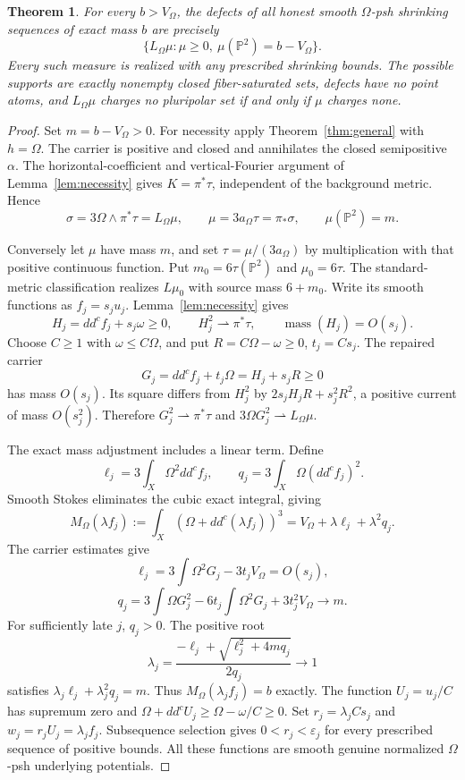 \documentclass[11pt]{article}
\newtheorem{theorem}{Theorem}
\newcommand{\ddc}{dd^c}
\begin{document}
\begin{theorem}\label{thm:arbitrary-metric}
For every $b>V_\Omega$, the defects of all honest smooth
$\Omega$-psh shrinking sequences of exact mass $b$ are precisely
\[
 \{L_\Omega\mu:\mu\geq0,\ \mu(\mathbb P^2)=b-V_\Omega\}.
\]
Every such measure is realized with any prescribed shrinking bounds.
The possible supports are exactly nonempty closed fiber-saturated
sets, defects have no point atoms, and $L_\Omega\mu$ charges no
pluripolar set if and only if $\mu$ charges none.
\end{theorem}

\begin{proof}
Set $m=b-V_\Omega>0$. For necessity apply
Theorem~\ref{thm:general} with $h=\Omega$.
The carrier is positive and closed and annihilates the closed
semipositive $\alpha$. The horizontal-coefficient and vertical-Fourier
argument of Lemma~\ref{lem:necessity} gives $K=\pi^*\tau$, independent
of the background metric. Hence
\[
 \sigma=3\Omega\wedge\pi^*\tau=L_\Omega\mu,
 \qquad \mu=3a_\Omega\tau=\pi_*\sigma,
 \qquad\mu(\mathbb P^2)=m.
\]

Conversely let $\mu$ have mass $m$, and set
$\tau=\mu/(3a_\Omega)$ by multiplication with that positive
continuous function. Put $m_0=6\tau(\mathbb P^2)$ and $\mu_0=6\tau$.
The standard-metric classification realizes $L\mu_0$ with source
mass $6+m_0$. Write its smooth functions as $f_j=s_ju_j$.
Lemma~\ref{lem:necessity} gives
\[
 H_j=\ddc f_j+s_j\omega\geq0,\qquad
 H_j^2\rightharpoonup\pi^*\tau,\qquad
 \operatorname{mass}(H_j)=O(s_j).
\]
Choose $C\geq1$ with $\omega\leq C\Omega$, and put
$R=C\Omega-\omega\geq0$, $t_j=Cs_j$.
The repaired carrier
\[
 G_j=\ddc f_j+t_j\Omega=H_j+s_jR\geq0
\]
has mass $O(s_j)$. Its square differs from $H_j^2$ by
$2s_jH_jR+s_j^2R^2$, a positive current of mass $O(s_j^2)$.
Therefore $G_j^2\rightharpoonup\pi^*\tau$ and
$3\Omega G_j^2\rightharpoonup L_\Omega\mu$.

The exact mass adjustment includes a linear term. Define
\[
 \ell_j=3\int_X\Omega^2\ddc f_j,
 \qquad q_j=3\int_X\Omega(\ddc f_j)^2.
\]
Smooth Stokes eliminates the cubic exact integral, giving
\[
 M_\Omega(\lambda f_j):=\int_X(\Omega+\ddc(\lambda f_j))^3
       =V_\Omega+\lambda\ell_j+\lambda^2q_j.
\]
The carrier estimates give
\[
 \ell_j=3\int\Omega^2G_j-3t_jV_\Omega=O(s_j),
\]
\[
 q_j=3\int\Omega G_j^2-6t_j\int\Omega^2G_j
                               +3t_j^2V_\Omega\longrightarrow m.
\]
For sufficiently late $j$, $q_j>0$. The positive root
\[
 \lambda_j=\frac{-\ell_j+\sqrt{\ell_j^2+4mq_j}}{2q_j}
             \longrightarrow1
\]
satisfies $\lambda_j\ell_j+\lambda_j^2q_j=m$.
Thus $M_\Omega(\lambda_jf_j)=b$ exactly.
The function $U_j=u_j/C$ has supremum zero and
$\Omega+\ddc U_j\geq\Omega-\omega/C\geq0$.
Set $r_j=\lambda_jCs_j$ and $w_j=r_jU_j=\lambda_jf_j$.
Subsequence selection gives $0<r_j<\varepsilon_j$ for every
prescribed sequence of positive bounds. All these functions are
smooth genuine normalized $\Omega$-psh underlying potentials.


\end{proof}
\end{document}

